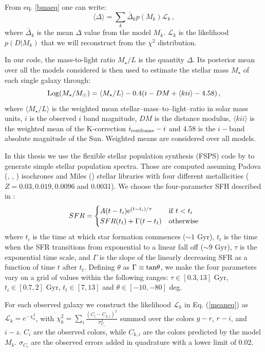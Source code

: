 From eq. \ref{bmaeq} one can write:
\begin{equation}
\langle\Delta\rangle=\sum_k \bar{\Delta}_k p(M_k)\mathcal{L}_k\, , \label{meaneq}
\end{equation}
where $\bar{\Delta}_k$ is the mean $\Delta$ value from the model $M_k$. $\mathcal{L}_k$ is the likelihood $p(D|M_k)$ that we will reconstruct from the $\chi^2$ distribution.

In our code, the mass-to-light ratio $M_\star/L$ is the quantity $\Delta$. Its posterior mean over all the models considered is then used to estimate the stellar mass $M_\star$ of each single galaxy through:
\begin{equation}
{\rm Log}{(M_\star/M_{\odot})}=\langle M_\star/L \rangle-0.4(i-DM+\langle kii \rangle -4.58)\,,
\end{equation}
where $\langle M_\star/L \rangle$ is the weighted mean stellar--mass--to--light--ratio in solar mass units, $i$ is the observed $i$ band magnitude, $DM$ is the distance modulus,  $\langle kii \rangle$ is the weighted mean of the K-correction $i_{\rm rest frame}-i$ and 4.58 is the $i-$band absolute magnitude of the Sun. Weighted means are considered over all models.

In this thesis we use the flexible stellar population synthesis (FSPS) code by \citet{fsps} to generate  simple  stellar population spectra. Those are computed assuming Padova (\citealt{padova1}, \citealt{padova2}, \citealt{padova3}) isochrones  and Miles (\citealt{miles}) stellar libraries with four different metallicities ($Z=0.03,0.019,0.0096$ and 0.0031). We choose the four-parameter SFH described in \citet{simha}:
\[
SFR=
\begin{cases} A(t-t_i){\rm e}^{(t-t_i)/\tau} & {\rm if }\; t<t_i\\
SFR(t_t)+\Gamma(t-t_t) &{\rm otherwise}
\end{cases}
\]
where $t_i$ is the time at which star formation commences ($\sim 1$ Gyr), $t_t$ is the time when the SFR transitions from exponential to a linear fall off ($\sim 9$ Gyr), $\tau$ is the exponential time scale, and $\Gamma$ is the slope of the linearly decreasing SFR as a function of time $t$ after $t_t$. Defining $\theta$ as $\Gamma\equiv{\rm tan}\theta$, we make the  four parameters vary on a grid of values within the following ranges: $\tau\in [0.3,13]$ Gyr, $t_i \in [0.7,2]$ Gyr, $t_t \in [7,13]$ and $\theta\in [-10,-80 ]$ deg.

For each observed galaxy we construct the likelihood $\mathcal{L}_k$ in Eq. (\ref{meaneq}) as $\mathcal{L}_k=e^{-\chi^2_k}$, with $\chi^2_k=\sum_i\frac{(C_i-C_{k,i})^2}{\sigma_{C_i}^2}$ summed over the colors $g-r$, $r-i$, and $i-z$. $C_i$ are the observed colors, while $C_{k,i}$ are the colors predicted by the model $M_k$. $\sigma_{C_i}$ are the observed errors added in quadrature with a lower limit of 0.02. 

